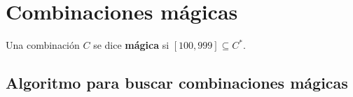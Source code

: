 \section{Combinaciones mágicas}

\begin{definition}
  Una combinación $C$ se dice \textbf{mágica} si $[100,999] \subseteq C^{\ast}$.
\end{definition}
\subsection{Algoritmo para buscar combinaciones mágicas}
